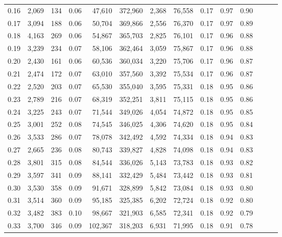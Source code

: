 \begin{tabular}{rrrrrrrrrrrrrr}
0.16 &   2,069 &    134 &  0.06 &   47,610 &  372,960 &   2,368 &  76,558 &  0.17 &  0.97 &      0.90 \\
0.17 &   3,094 &    188 &  0.06 &   50,704 &  369,866 &   2,556 &  76,370 &  0.17 &  0.97 &      0.89 \\
0.18 &   4,163 &    269 &  0.06 &   54,867 &  365,703 &   2,825 &  76,101 &  0.17 &  0.96 &      0.88 \\
0.19 &   3,239 &    234 &  0.07 &   58,106 &  362,464 &   3,059 &  75,867 &  0.17 &  0.96 &      0.88 \\
0.20 &   2,430 &    161 &  0.06 &   60,536 &  360,034 &   3,220 &  75,706 &  0.17 &  0.96 &      0.87 \\
0.21 &   2,474 &    172 &  0.07 &   63,010 &  357,560 &   3,392 &  75,534 &  0.17 &  0.96 &      0.87 \\
0.22 &   2,520 &    203 &  0.07 &   65,530 &  355,040 &   3,595 &  75,331 &  0.18 &  0.95 &      0.86 \\
0.23 &   2,789 &    216 &  0.07 &   68,319 &  352,251 &   3,811 &  75,115 &  0.18 &  0.95 &      0.86 \\
0.24 &   3,225 &    243 &  0.07 &   71,544 &  349,026 &   4,054 &  74,872 &  0.18 &  0.95 &      0.85 \\
0.25 &   3,001 &    252 &  0.08 &   74,545 &  346,025 &   4,306 &  74,620 &  0.18 &  0.95 &      0.84 \\
0.26 &   3,533 &    286 &  0.07 &   78,078 &  342,492 &   4,592 &  74,334 &  0.18 &  0.94 &      0.83 \\
0.27 &   2,665 &    236 &  0.08 &   80,743 &  339,827 &   4,828 &  74,098 &  0.18 &  0.94 &      0.83 \\
0.28 &   3,801 &    315 &  0.08 &   84,544 &  336,026 &   5,143 &  73,783 &  0.18 &  0.93 &      0.82 \\
0.29 &   3,597 &    341 &  0.09 &   88,141 &  332,429 &   5,484 &  73,442 &  0.18 &  0.93 &      0.81 \\
0.30 &   3,530 &    358 &  0.09 &   91,671 &  328,899 &   5,842 &  73,084 &  0.18 &  0.93 &      0.80 \\
0.31 &   3,514 &    360 &  0.09 &   95,185 &  325,385 &   6,202 &  72,724 &  0.18 &  0.92 &      0.80 \\
0.32 &   3,482 &    383 &  0.10 &   98,667 &  321,903 &   6,585 &  72,341 &  0.18 &  0.92 &      0.79 \\
0.33 &   3,700 &    346 &  0.09 &  102,367 &  318,203 &   6,931 &  71,995 &  0.18 &  0.91 &      0.78 \\

\end{tabular}
